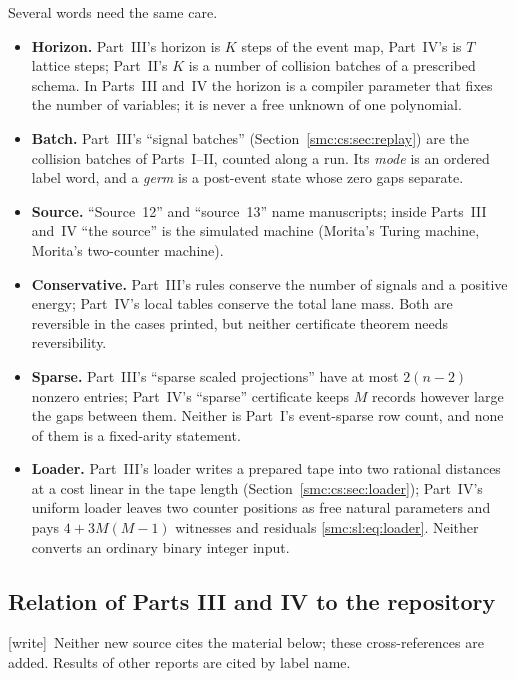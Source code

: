\documentclass[11pt,letterpaper]{article}
\numberwithin{equation}{section}
\theoremstyle{definition}
\theoremstyle{remark}
\newcommand{\wtag}{\textup{[write]}}
\begin{document}
Several words need the same care.
\begin{itemize}
\item \textbf{Horizon.} Part~III's horizon is $K$ steps of the event map, Part~IV's is $T$ lattice steps; Part~II's $K$ is a number of collision batches of a prescribed schema. In Parts~III and~IV the horizon is a compiler parameter that fixes the number of variables; it is never a free unknown of one polynomial.
\item \textbf{Batch.} Part~III's ``signal batches'' (Section~\ref{smc:cs:sec:replay}) are the collision batches of Parts~I--II, counted along a run. Its \emph{mode} is an ordered label word, and a \emph{germ} is a post-event state whose zero gaps separate.
\item \textbf{Source.} ``Source~12'' and ``source~13'' name manuscripts; inside Parts~III and~IV ``the source'' is the simulated machine (Morita's Turing machine, Morita's two-counter machine).
\item \textbf{Conservative.} Part~III's rules conserve the number of signals and a positive energy; Part~IV's local tables conserve the total lane mass. Both are reversible in the cases printed, but neither certificate theorem needs reversibility.
\item \textbf{Sparse.} Part~III's ``sparse scaled projections'' have at most $2(n-2)$ nonzero entries; Part~IV's ``sparse'' certificate keeps $M$ records however large the gaps between them. Neither is Part~I's event-sparse row count, and none of them is a fixed-arity statement.
\item \textbf{Loader.} Part~III's loader writes a prepared tape into two rational distances at a cost linear in the tape length (Section~\ref{smc:cs:sec:loader}); Part~IV's uniform loader leaves two counter positions as free natural parameters and pays $4+3M(M-1)$ witnesses and residuals \eqref{smc:sl:eq:loader}. Neither converts an ordinary binary integer input.
\end{itemize}

\subsection{Relation of Parts III and IV to the repository}\label{smc:cs:sec:relation}

\wtag\ Neither new source cites the material below; these cross-references are added. Results of other reports are cited by label name.
\end{document}
